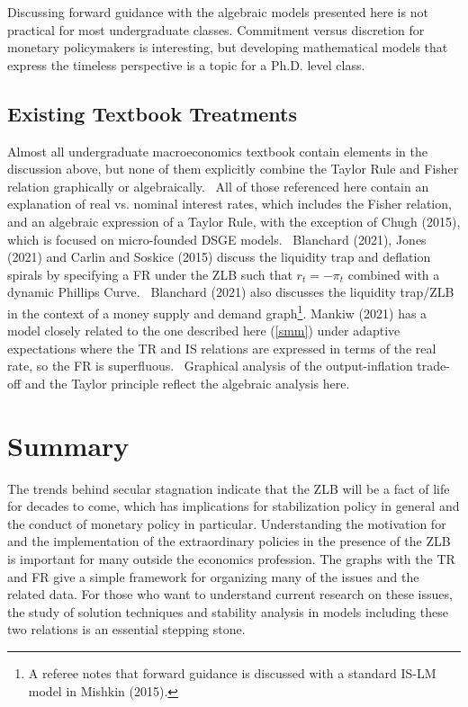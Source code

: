 \documentclass{article}
\begin{document}
\begin{doublespace}
Discussing forward guidance with the algebraic models presented here is not
practical for most undergraduate classes. Commitment versus discretion for
monetary policymakers is interesting, but developing mathematical models
that express the timeless perspective is a topic for a Ph.D. level class.

\subsection{Existing Textbook Treatments}

Almost all undergraduate macroeconomics textbook contain elements in the
discussion above, but none of them explicitly combine the Taylor Rule and
Fisher relation graphically or algebraically. \ All of those referenced here
contain an explanation of real vs. nominal interest rates, which includes
the Fisher relation, and an algebraic expression of a Taylor Rule, with the
exception of Chugh (2015), which is focused on micro-founded DSGE models. \
Blanchard (2021), Jones (2021) and Carlin and Soskice (2015) discuss the
liquidity trap and deflation spirals by specifying a FR under the ZLB such
that $r_{t}=-\pi _{t}$ combined with a dynamic Phillips Curve. \ Blanchard
(2021) also discusses the liquidity trap/ZLB in the context of a money
supply and demand graph\footnote{%
A referee notes that forward guidance is discussed with a standard IS-LM
model in Mishkin (2015).}. Mankiw (2021) has a model closely related to the
one described here (\ref{smm}) under adaptive expectations where the TR and
IS relations are expressed in terms of the real rate, so the FR is
superfluous. \ Graphical analysis of the output-inflation trade-off and the
Taylor principle reflect the algebraic analysis here.

\section{Summary}

The trends behind secular stagnation indicate that the ZLB will be a fact of
life for decades to come, which has implications for stabilization policy in
general and the conduct of monetary policy in particular. Understanding the
motivation for and the implementation of the extraordinary policies in the
presence of the ZLB is important for many outside the economics profession.
The graphs with the TR and FR give a simple framework for organizing many of
the issues and the related data. For those who want to understand current
research on these issues, the study of solution techniques and stability
analysis in models including these two relations is an essential stepping
stone.


\end{doublespace}
\end{document}
